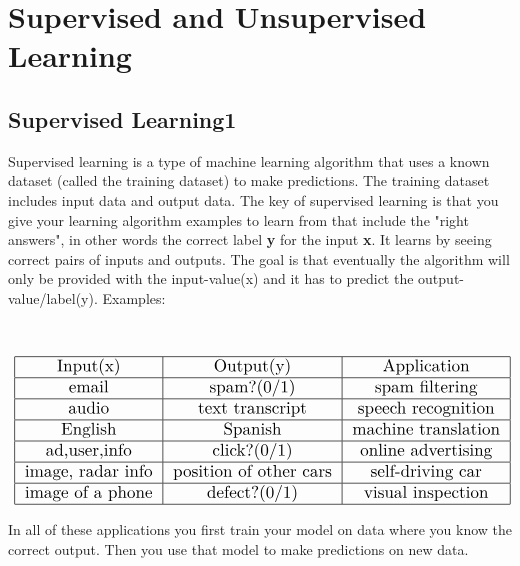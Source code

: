 \section{Supervised and Unsupervised Learning}

\subsection{Supervised Learning1}
Supervised learning is a type of machine learning algorithm that uses a known dataset (called the training dataset) to make predictions. The training dataset includes input data and output data. The key of supervised learning is that you give your learning algorithm examples to learn from that include the "right answers", in other words the correct label \textbf{y} for the input \textbf{x}.
It learns by seeing correct pairs of inputs and outputs.  The goal is that eventually the algorithm will only be provided with the input-value(x) and it has to predict the output-value/label(y).
Examples: \\ \\ \\

\begin{align*}
  \scalebox{1.3}{
    \begin{tabular}{|c|c|c|}
      \hline
      Input(x)          & Output(y)              & Application         \\
      \hline
      email             & spam?(0/1)             & spam filtering      \\
      \hline
      audio             & text transcript        & speech recognition  \\
      \hline
      English           & Spanish                & machine translation \\
      \hline
      ad,user,info      & click?(0/1)            & online advertising  \\
      \hline
      image, radar info & position of other cars & self-driving car    \\
      \hline
      image of a phone  & defect?(0/1)           & visual inspection   \\
      \hline
    \end{tabular}}
\end{align*}

In all of these applications you first train your model on data where you know the correct output. Then you use that model to make predictions on new data. \\


